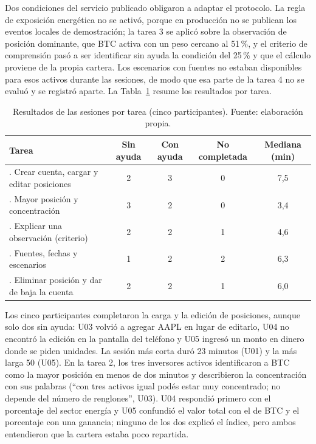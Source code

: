 Dos condiciones del servicio publicado obligaron a adaptar el protocolo. La regla de exposición energética no se activó, porque en producción no se publican los eventos locales de demostración; la tarea 3 se aplicó sobre la observación de posición dominante, que BTC activa con un peso cercano al 51\,\%, y el criterio de comprensión pasó a ser identificar sin ayuda la condición del 25\,\% y que el cálculo proviene de la propia cartera. Los escenarios con fuentes no estaban disponibles para esos activos durante las sesiones, de modo que esa parte de la tarea 4 no se evaluó y se registró aparte. La Tabla~\ref{tab:sesiones-resultados} resume los resultados por tarea.

\begin{table}[ht]
\centering\small\renewcommand{\arraystretch}{1.15}
\caption{Resultados de las sesiones por tarea (cinco participantes). Fuente: elaboración propia.}\label{tab:sesiones-resultados}
\begin{tabular}{>{\raggedright\arraybackslash}p{5.4cm}cccc}\hline
\textbf{Tarea} & \textbf{Sin ayuda} & \textbf{Con ayuda} & \textbf{No completada} & \textbf{Mediana (min)}\\\hline
1. Crear cuenta, cargar y editar posiciones & 2 & 3 & 0 & 7,5\\
2. Mayor posición y concentración & 3 & 2 & 0 & 3,4\\
3. Explicar una observación (criterio) & 2 & 2 & 1 & 4,6\\
4. Fuentes, fechas y escenarios & 1 & 2 & 2 & 6,3\\
5. Eliminar posición y dar de baja la cuenta & 2 & 2 & 1 & 6,0\\\hline
\end{tabular}
\end{table}

Los cinco participantes completaron la carga y la edición de posiciones, aunque solo dos sin ayuda: U03 volvió a agregar AAPL en lugar de editarlo, U04 no encontró la edición en la pantalla del teléfono y U05 ingresó un monto en dinero donde se piden unidades. La sesión más corta duró 23 minutos (U01) y la más larga 50 (U05). En la tarea 2, los tres inversores activos identificaron a BTC como la mayor posición en menos de dos minutos y describieron la concentración con sus palabras (\enquote{con tres activos igual podés estar muy concentrado; no depende del número de renglones}, U03). U04 respondió primero con el porcentaje del sector energía y U05 confundió el valor total con el de BTC y el porcentaje con una ganancia; ninguno de los dos explicó el índice, pero ambos entendieron que la cartera estaba poco repartida.

